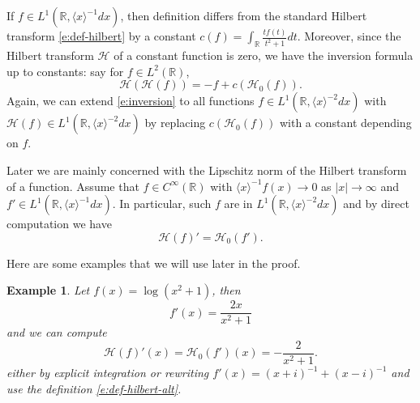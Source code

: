 \documentclass[reqno,12pt,letterpaper]{amsart}
\newtheorem{exa}[prop]{Example}
\numberwithin{equation}{section}
\numberwithin{prop}{section}
\begin{document}

If $f\in L^1(\mathbb{R},\langle x\rangle^{-1}dx)$, then definition differs from the standard Hilbert transform \eqref{e:def-hilbert} by a constant 
$c(f)=\int_{\mathbb{R}}\frac{tf(t)}{t^2+1}dt$.
Moreover, since the Hilbert transform $\mathcal{H}$ of a constant function is zero, we have the inversion formula up to constants: say for $f\in L^2(\mathbb{R})$,
\begin{equation}
\label{e:inversion}
\mathcal{H}(\mathcal{H}(f))=-f+c(\mathcal{H}_0(f)).
\end{equation}
Again, we can extend \eqref{e:inversion} to all functions $f\in L^1(\mathbb{R},\langle x\rangle^{-2}dx)$ with $\mathcal{H}(f)\in L^1(\mathbb{R},\langle x\rangle^{-2}dx)$ by replacing $c(\mathcal{H}_0(f))$ with a constant depending on $f$.


Later we are mainly concerned with the Lipschitz norm of the Hilbert transform of a function. Assume that $f\in C^\infty(\mathbb{R})$ with $\langle x\rangle^{-1}f(x)\to0$ as $|x|\to\infty$ and $f'\in L^1(\mathbb{R},\langle x\rangle^{-1}dx)$. In particular, such $f$ are in $L^1(\mathbb{R},\langle x\rangle^{-2}dx)$ and by direct computation we have
\begin{equation*}
\mathcal{H}(f)'=\mathcal{H}_0(f'). 
\end{equation*}

Here are some examples that we will use later in the proof.

\begin{exa}
Let $f(x)=\log(x^2+1)$, then 
\begin{equation*}
f'(x)=\frac{2x}{x^2+1}
\end{equation*}
and we can compute
\begin{equation}
\label{e:example1}
\mathcal{H}(f)'(x)=\mathcal{H}_0(f')(x)=-\frac{2}{x^2+1}.
\end{equation}
either by explicit integration or rewriting $f'(x)=(x+i)^{-1}+(x-i)^{-1}$ and use the definition \eqref{e:def-hilbert-alt}.
\end{exa}
\end{document}
